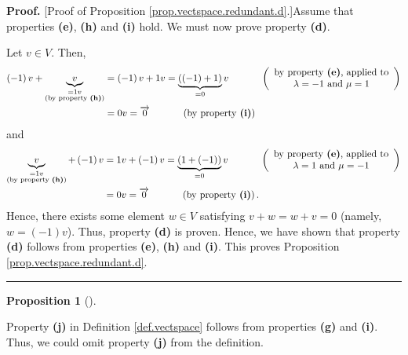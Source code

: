 \documentclass[numbers=enddot,12pt,final,onecolumn,notitlepage]{scrartcl}%
\theoremstyle{definition}
\newtheorem{prop}[theo]{Proposition}
\newenvironment{proposition}[1][]
{\begin{prop}[#1]\begin{leftbar}}
{\end{leftbar}\end{prop}}
\newenvironment{proof}[1][Proof]{\noindent\textbf{#1.} }{\ \rule{0.5em}{0.5em}}
\begin{document}
\begin{proof}
[Proof of Proposition \ref{prop.vectspace.redundant.d}.]Assume that properties
\textbf{(e)}, \textbf{(h)} and \textbf{(i)} hold. We must now prove property
\textbf{(d)}.

Let $v\in V$. Then,
\begin{align*}
\left(  -1\right)  v+\underbrace{v}_{\substack{=1v\\\text{(by property
\textbf{(h)})}}}  &  =\left(  -1\right)  v+1v=\underbrace{\left(  \left(
-1\right)  +1\right)  }_{=0}v\ \ \ \ \ \ \ \ \ \ \left(
\begin{array}
[c]{c}%
\text{by property \textbf{(e)}, applied to}\\
\lambda=-1\text{ and }\mu=1
\end{array}
\right) \\
&  =0v=\overrightarrow{0}\ \ \ \ \ \ \ \ \ \ \left(  \text{by property
\textbf{(i)}}\right)
\end{align*}
and%
\begin{align*}
\underbrace{v}_{\substack{=1v\\\text{(by property \textbf{(h)})}}}+\left(
-1\right)  v  &  =1v+\left(  -1\right)  v=\underbrace{\left(  1+\left(
-1\right)  \right)  }_{=0}v\ \ \ \ \ \ \ \ \ \ \left(
\begin{array}
[c]{c}%
\text{by property \textbf{(e)}, applied to}\\
\lambda=1\text{ and }\mu=-1
\end{array}
\right) \\
&  =0v=\overrightarrow{0}\ \ \ \ \ \ \ \ \ \ \left(  \text{by property
\textbf{(i)}}\right)  .
\end{align*}
Hence, there exists some element $w\in V$ satisfying $v+w=w+v=0$ (namely,
$w=\left(  -1\right)  v$). Thus, property \textbf{(d)} is proven. Hence, we
have shown that property \textbf{(d)} follows from properties \textbf{(e)},
\textbf{(h)} and \textbf{(i)}. This proves Proposition
\ref{prop.vectspace.redundant.d}.
\end{proof}

\begin{proposition}
\label{prop.vectspace.redundant.j}Property \textbf{(j)} in Definition
\ref{def.vectspace} follows from properties \textbf{(g)} and \textbf{(i)}.
Thus, we could omit property \textbf{(j)} from the definition.
\end{proposition}
\end{document}
